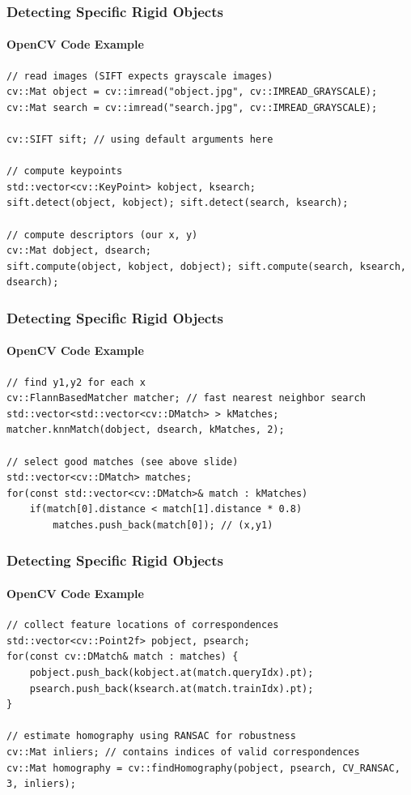\documentclass[xetex,professionalfont]{beamer}
\begin{document}

\begin{frame}[fragile]
\frametitle{Detecting Specific Rigid Objects}
\framesubtitle{OpenCV Code Example}

\footnotesize
\begin{verbatim}
// read images (SIFT expects grayscale images)
cv::Mat object = cv::imread("object.jpg", cv::IMREAD_GRAYSCALE);
cv::Mat search = cv::imread("search.jpg", cv::IMREAD_GRAYSCALE);

cv::SIFT sift; // using default arguments here

// compute keypoints
std::vector<cv::KeyPoint> kobject, ksearch;
sift.detect(object, kobject); sift.detect(search, ksearch);

// compute descriptors (our x, y)
cv::Mat dobject, dsearch;
sift.compute(object, kobject, dobject); sift.compute(search, ksearch, dsearch);
\end{verbatim}

\end{frame}


\begin{frame}[fragile]
\frametitle{Detecting Specific Rigid Objects}
\framesubtitle{OpenCV Code Example}

\footnotesize
\begin{verbatim}
// find y1,y2 for each x
cv::FlannBasedMatcher matcher; // fast nearest neighbor search
std::vector<std::vector<cv::DMatch> > kMatches;
matcher.knnMatch(dobject, dsearch, kMatches, 2);

// select good matches (see above slide)
std::vector<cv::DMatch> matches;
for(const std::vector<cv::DMatch>& match : kMatches)
    if(match[0].distance < match[1].distance * 0.8)
        matches.push_back(match[0]); // (x,y1)
\end{verbatim}

\end{frame}


\begin{frame}[fragile]
\frametitle{Detecting Specific Rigid Objects}
\framesubtitle{OpenCV Code Example}

\footnotesize
\begin{verbatim}
// collect feature locations of correspondences
std::vector<cv::Point2f> pobject, psearch;
for(const cv::DMatch& match : matches) { 
    pobject.push_back(kobject.at(match.queryIdx).pt);
    psearch.push_back(ksearch.at(match.trainIdx).pt);
}

// estimate homography using RANSAC for robustness
cv::Mat inliers; // contains indices of valid correspondences
cv::Mat homography = cv::findHomography(pobject, psearch, CV_RANSAC, 3, inliers);
\end{verbatim}

\end{frame}
\end{document}
